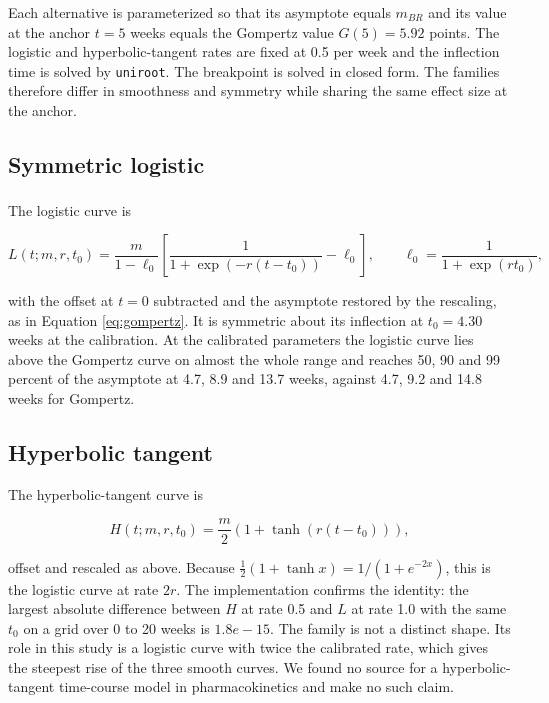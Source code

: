 \documentclass[
  11pt,
]{article}
\begin{document}
Each alternative is parameterized so that its asymptote equals \(m_{BR}\)
and its value at the anchor \(t = 5\) weeks equals the Gompertz value
\(G(5) = 5.92\) points. The logistic and
hyperbolic-tangent rates are fixed at 0.5 per week and the inflection
time is solved by \texttt{uniroot}. The breakpoint is solved in closed form.
The families therefore differ in smoothness and symmetry while sharing
the same effect size at the anchor.

\subsection{Symmetric logistic}\label{symmetric-logistic}

The logistic curve\textsuperscript{} is

\begin{equation}
L(t; m, r, t_0) = \frac{m}{1 - \ell_0}\left[\frac{1}{1 + \exp(-r(t - t_0))} - \ell_0\right],
\qquad \ell_0 = \frac{1}{1 + \exp(r t_0)},
\label{eq:logistic}
\end{equation}

with the offset at \(t = 0\) subtracted and the asymptote restored by the
rescaling, as in Equation \eqref{eq:gompertz}. It is symmetric about
its inflection at \(t_0 = 4.30\)
weeks at the calibration. At the calibrated parameters the logistic
curve lies above the Gompertz curve on almost the whole range and
reaches 50, 90 and 99 percent of the asymptote at
4.7,
8.9 and
13.7 weeks, against
4.7,
9.2 and
14.8 weeks for Gompertz.

\subsection{Hyperbolic tangent}\label{hyperbolic-tangent}

The hyperbolic-tangent curve is

\begin{equation}
H(t; m, r, t_0) = \frac{m}{2}\left(1 + \tanh(r(t - t_0))\right),
\label{eq:tanh}
\end{equation}

offset and rescaled as above. Because \(\tfrac{1}{2}(1 + \tanh x) =
1/(1 + e^{-2x})\), this is the logistic curve at rate \(2r\). The
implementation confirms the identity: the largest absolute difference
between \(H\) at rate 0.5 and \(L\) at rate 1.0 with the same \(t_0\) on a
grid over 0 to 20 weeks is
\(1.8e-15\). The family is
not a distinct shape. Its role in this study is a logistic curve with
twice the calibrated rate, which gives the steepest rise of the three
smooth curves. We found no source for a hyperbolic-tangent time-course
model in pharmacokinetics and make no such claim.
\end{document}
